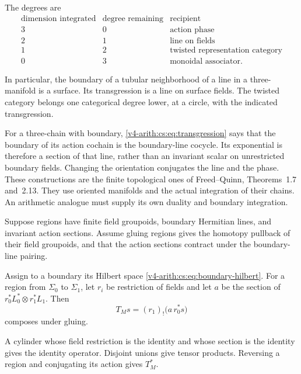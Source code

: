 The degrees are
\[
\begin{array}{c|c|c}
 \text{dimension integrated}&\text{degree remaining}&\text{recipient}\\\hline
 3&0&\text{action phase}\\
 2&1&\text{line on fields}\\
 1&2&\text{twisted representation category}\\
 0&3&\text{monoidal associator}.
\end{array}
\]

In particular, the boundary of a tubular neighborhood of a line in a
three-manifold is a surface. Its transgression is a line on surface fields.
The twisted category belongs one categorical degree lower, at a circle, with
the indicated transgression.

For a three-chain with boundary, \eqref{v4-arith:cs:eq:transgression} says
that the boundary of its action cochain is the boundary-line cocycle. Its
exponential is therefore a section of that line, rather than an invariant
scalar on unrestricted boundary fields. Changing the orientation conjugates
the line and the phase. These constructions are the finite topological ones
of Freed--Quinn, Theorems~1.7 and~2.13. They use oriented manifolds and the
actual integration of their chains. An arithmetic analogue must supply its
own duality and boundary integration.

\begin{theorem}
\label{v4-arith:cs:thm:gluing}
Suppose regions have finite field groupoids, boundary Hermitian lines, and
invariant action sections. Assume gluing regions gives the homotopy pullback
of their field groupoids, and that the action sections contract under the
boundary-line pairing.

Assign to a boundary its Hilbert space
\eqref{v4-arith:cs:eq:boundary-hilbert}. For a region from \(\Sigma_0\) to
\(\Sigma_1\), let \(r_i\) be restriction of fields and let \(a\) be the
section of \(r_0^*L_0^*\otimes r_1^*L_1\). Then
\begin{equation}
 T_Ms=(r_1)_!\bigl(a\,r_0^*s\bigr)
 \label{v4-arith:cs:eq:region-operator}
\end{equation}
composes under gluing.

A cylinder whose field restriction is the identity and whose section is the
identity gives the identity operator. Disjoint unions give tensor products.
Reversing a region and conjugating its action gives \(T_M^*\).
\end{theorem}

